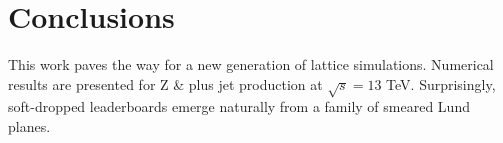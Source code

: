 \section{Conclusions}\label{sec:conclusions}

This work paves the way for a new generation of lattice simulations.
Numerical results are presented for Z & plus jet production at $\sqrt{s} =
13$ TeV. Surprisingly, soft-dropped leaderboards emerge naturally from a
family of smeared Lund planes.


